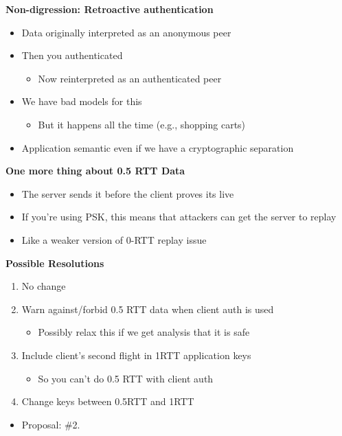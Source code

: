 \documentclass[helvetica]{seminar}
\newcommand{\heading}[1]{%
  \begin{center} 
    \large\bf 
    #1 
  \end{center} 
  \vspace{.4 in}}
\begin{document}
\begin{slide}
\heading{Non-digression: Retroactive authentication}

\begin{itemize}
\item Data originally interpreted as an anonymous peer
\item Then you authenticated
  \begin{itemize}
  \item Now reinterpreted as an authenticated peer
  \end{itemize}
\item We have bad models for this
  \begin{itemize}
  \item But it happens all the time (e.g., shopping carts)
  \end{itemize}

\item Application semantic even if we have a cryptographic separation
\end{itemize}
\end{slide}


\begin{slide}
\heading{One more thing about 0.5 RTT Data}

\begin{itemize}
\item The server sends it before the client proves its live
\item If you're using PSK, this means that attackers can get the server to replay
\item Like a weaker version of 0-RTT replay issue
\end{itemize}

\end{slide}


\begin{slide}
\heading{Possible Resolutions}

\begin{enumerate}
\item No change
\item Warn against/forbid 0.5 RTT data when client auth is used 
  \begin{itemize}
  \item Possibly relax this if we get analysis that it is safe
  \end{itemize}
\item Include client's second flight in 1RTT application keys
  \begin{itemize}
  \item So you can't do 0.5 RTT with client auth
  \end{itemize}
\item Change keys between 0.5RTT and 1RTT
\end{enumerate}

\begin{itemize}
\item Proposal: \#2.
\end{itemize}
\end{slide}
\end{document}

